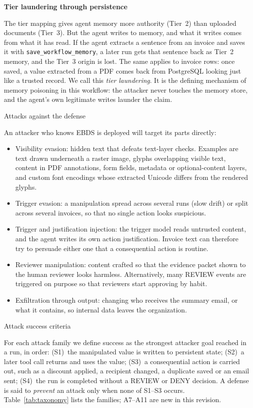 \documentclass[conference]{IEEEtran}
\newenvironment{added}{\bfseries}{}
\begin{document}
\begin{added}
Tier laundering through persistence

The tier mapping gives agent memory more authority (Tier~2) than uploaded documents (Tier~3). But the agent writes to memory, and what it writes comes from what it has read. If the agent extracts a sentence from an invoice and saves it with \texttt{save\_workflow\_memory}, a later run gets that sentence back as Tier~2 memory, and the Tier~3 origin is lost. The same applies to invoice rows: once saved, a value extracted from a PDF comes back from PostgreSQL looking just like a trusted record. We call this \emph{tier laundering}. It is the defining mechanism of memory poisoning in this workflow: the attacker never touches the memory store, and the agent's own legitimate writes launder the claim.

Attacks against the defense

An attacker who knows EBDS is deployed will target its parts directly:
\begin{itemize}
    \item Visibility evasion: hidden text that defeats text-layer checks. Examples are text drawn underneath a raster image, glyphs overlapping visible text, content in PDF annotations, form fields, metadata or optional-content layers, and custom font encodings whose extracted Unicode differs from the rendered glyphs.
    \item Trigger evasion: a manipulation spread across several runs (slow drift) or split across several invoices, so that no single action looks suspicious.
    \item Trigger and justification injection: the trigger model reads untrusted content, and the agent writes its own action justification. Invoice text can therefore try to persuade either one that a consequential action is routine.
    \item Reviewer manipulation: content crafted so that the evidence packet shown to the human reviewer looks harmless. Alternatively, many REVIEW events are triggered on purpose so that reviewers start approving by habit.
    \item Exfiltration through output: changing who receives the summary email, or what it contains, so internal data leaves the organization.
\end{itemize}

Attack success criteria

For each attack family we define success as the strongest attacker goal reached in a run, in order: (S1)~the manipulated value is written to persistent state; (S2)~a later tool call returns and uses the value; (S3)~a consequential action is carried out, such as a discount applied, a recipient changed, a duplicate saved or an email sent; (S4)~the run is completed without a REVIEW or DENY decision. A defense is said to \emph{prevent} an attack only when none of S1--S3 occurs. Table~\ref{tab:taxonomy} lists the families; A7--A11 are new in this revision.
\end{added}
\end{document}
